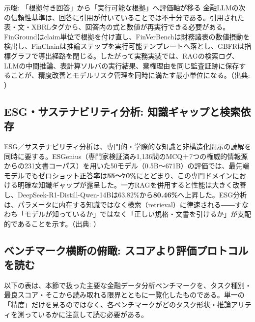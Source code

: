 \begin{insight}{示唆: 「根拠付き回答」から「実行可能な根拠」へ評価軸が移る}
金融LLMの次の信頼性基準は、回答に引用が付いていることでは不十分である。引用された表・文・XBRLタグから、回答内の式と数値が再実行できる必要がある。FinGroundはclaim単位で根拠を付け直し、FinVerBenchは財務諸表の数値摂動を検出し、FinChainは推論ステップを実行可能テンプレートへ落とし、GBFRは指標グラフで導出経路を閉じる。したがって実務実装では、RAGの検索ログ、LLMの中間推論、表計算ソルバの実行結果、棄権理由を同じ監査証跡に保存することが、精度改善とモデルリスク管理を同時に満たす最小単位になる。（出典: \cite{finground2026,finverbench2026,x05finchain2025,x05gbfr2026,auditflow2026}）
\end{insight}

\subsection{ESG・サステナビリティ分析: 知識ギャップと検索依存}

ESG／サステナビリティ分析は、専門的・学際的な知識と非構造化開示の読解を同時に要する。ESGenius（専門家検証済み1,136問のMCQ＋7つの権威的情報源からの231文書コーパス）を用いた50モデル（0.5B〜671B）の評価では、最先端モデルでもゼロショット正答率は\textbf{55〜70\%}にとどまり、この専門ドメインにおける明確な知識ギャップが露呈した。一方RAGを併用すると性能は大きく改善し、DeepSeek-R1-Distill-Qwen-14Bは63.82\%から\textbf{80.46\%}へ上昇した。ESG分析は、パラメータに内在する知識ではなく検索（retrieval）に律速される――すなわち「モデルが知っているか」ではなく「正しい規格・文書を引けるか」が支配的であることを示す。（出典: \cite{x05esgenius2025}）

\subsection{ベンチマーク横断の俯瞰: スコアより評価プロトコルを読む}

以下の表は、本節で扱った主要な金融データ分析ベンチマークを、タスク種別・最良スコア・そこから読み取れる限界とともに一覧化したものである。単一の「精度」だけを見るのではなく、各ベンチマークがどのタスク形状・推論アリティを測っているかに注意して読む必要がある。

